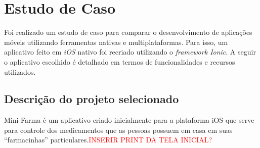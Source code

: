 \chapter{Estudo de Caso} \label{estudodecaso}

Foi realizado um estudo de caso para comparar o desenvolvimento de aplicações móveis utilizando ferramentas nativas e multiplataformas. Para isso, um aplicativo feito em \textit{iOS} 
nativo foi recriado utilizando o \textit{framework Ionic}. A seguir o aplicativo escolhido é detalhado em termos de funcionalidades e recursos utilizados. 

\section{Descrição do projeto selecionado} \label{subsec:descricaodoprojeto}

Mini Farma é um aplicativo criado inicialmente para a plataforma iOS que serve para controle dos medicamentos que as 
pessoas possuem em casa em suas ``farmacinhas'' particulares.\textcolor{red}{INSERIR PRINT DA TELA INICIAL?}


